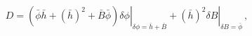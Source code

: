 \begin{equation*}
D=\left. (\bar{\phi}\bar{h}+(\bar{h})^{2}+\bar{B}\bar{\phi})\delta \phi
\right| _{\delta \phi =\bar{h}+\bar{B}}+\left. (\bar{h})^{2}\delta B\right|
_{\delta B=\bar{\phi}}\,,
\end{equation*}

